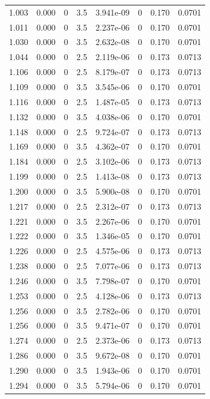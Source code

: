 \documentclass[preview]{standalone}
\begin{document}
{{{\begin{tabular}{L{1.2cm}C{1.2cm} C{0.3cm}C{0.5cm} C{1.4cm}C{1.4cm} C{1.4cm}C{1.4cm}}
  1.003  &  0.000  & 0     & 3.5 &  3.941e-09  & 0  & 0.170 &  0.0701   \\ 
  1.011  &  0.000  & 0     & 3.5 &  2.237e-06  & 0  & 0.170 &  0.0701   \\ 
  1.030  &  0.000  & 0     & 3.5 &  2.632e-08  & 0  & 0.170 &  0.0701   \\ 
  1.044  &  0.000  & 0     & 2.5 &  2.119e-06  & 0  & 0.173 &  0.0713   \\ 
  1.106  &  0.000  & 0     & 2.5 &  8.179e-07  & 0  & 0.173 &  0.0713   \\ 
  1.109  &  0.000  & 0     & 3.5 &  3.545e-06  & 0  & 0.170 &  0.0701   \\ 
  1.116  &  0.000  & 0     & 2.5 &  1.487e-05  & 0  & 0.173 &  0.0713   \\ 
  1.132  &  0.000  & 0     & 3.5 &  4.038e-06  & 0  & 0.170 &  0.0701   \\ 
  1.148  &  0.000  & 0     & 2.5 &  9.724e-07  & 0  & 0.173 &  0.0713   \\ 
  1.169  &  0.000  & 0     & 3.5 &  4.362e-07  & 0  & 0.170 &  0.0701   \\ 
  1.184  &  0.000  & 0     & 2.5 &  3.102e-06  & 0  & 0.173 &  0.0713   \\ 
  1.199  &  0.000  & 0     & 2.5 &  1.413e-08  & 0  & 0.173 &  0.0713   \\ 
  1.200  &  0.000  & 0     & 3.5 &  5.900e-08  & 0  & 0.170 &  0.0701   \\ 
  1.217  &  0.000  & 0     & 2.5 &  2.312e-07  & 0  & 0.173 &  0.0713   \\ 
  1.221  &  0.000  & 0     & 3.5 &  2.267e-06  & 0  & 0.170 &  0.0701   \\ 
  1.222  &  0.000  & 0     & 3.5 &  1.346e-05  & 0  & 0.170 &  0.0701   \\ 
  1.226  &  0.000  & 0     & 2.5 &  4.575e-06  & 0  & 0.173 &  0.0713   \\ 
  1.238  &  0.000  & 0     & 2.5 &  7.077e-06  & 0  & 0.173 &  0.0713   \\ 
  1.246  &  0.000  & 0     & 3.5 &  7.798e-07  & 0  & 0.170 &  0.0701   \\ 
  1.253  &  0.000  & 0     & 2.5 &  4.128e-06  & 0  & 0.173 &  0.0713   \\ 
  1.256  &  0.000  & 0     & 3.5 &  2.782e-06  & 0  & 0.170 &  0.0701   \\ 
  1.256  &  0.000  & 0     & 3.5 &  9.471e-07  & 0  & 0.170 &  0.0701   \\ 
  1.274  &  0.000  & 0     & 2.5 &  2.373e-06  & 0  & 0.173 &  0.0713   \\ 
  1.286  &  0.000  & 0     & 3.5 &  9.672e-08  & 0  & 0.170 &  0.0701   \\ 
  1.290  &  0.000  & 0     & 3.5 &  1.943e-06  & 0  & 0.170 &  0.0701   \\ 
  1.294  &  0.000  & 0     & 3.5 &  5.794e-06  & 0  & 0.170 &  0.0701   \\ 
\hline 
\end{tabular} 

}}}
\end{document}
